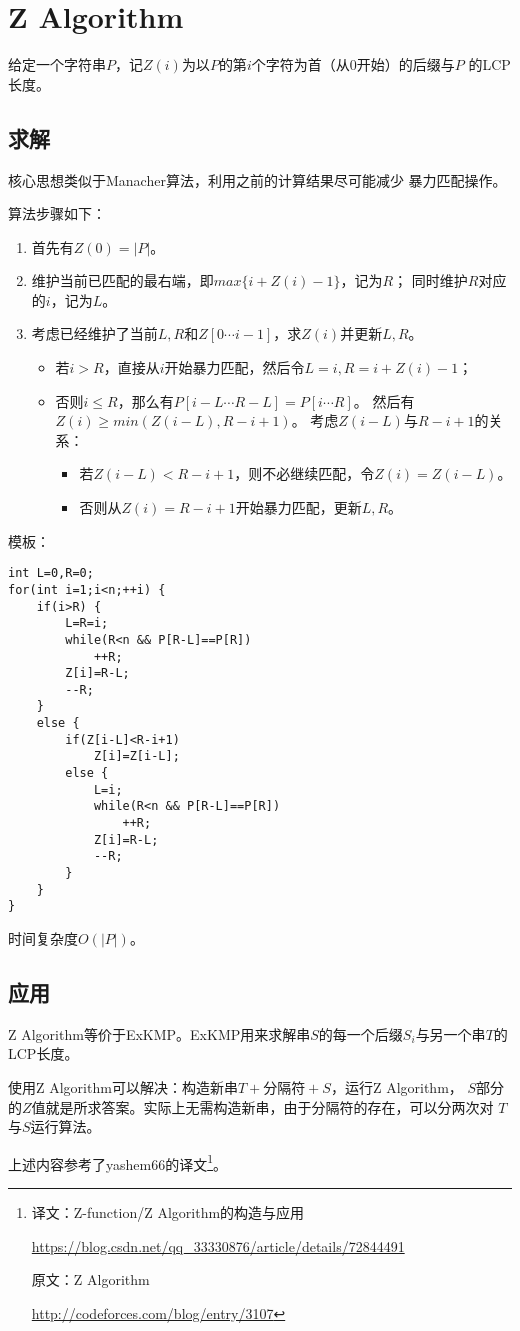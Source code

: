 \section{Z Algorithm}
\label{ZA}
给定一个字符串$P$，记$Z(i)$为以$P$的第$i$个字符为首（从0开始）的后缀与$P$
的LCP长度。
\subsection{求解}
核心思想类似于Manacher算法，利用之前的计算结果尽可能减少
暴力匹配操作。

算法步骤如下：
\begin{enumerate}
    \item 首先有$Z(0)=|P|$。
    \item 维护当前已匹配的最右端，即$max\{i+Z(i)-1\}$，记为$R$；
    同时维护$R$对应的$i$，记为$L$。
    \item 考虑已经维护了当前$L,R$和$Z[0\cdots i-1]$，求$Z(i)$并更新$L,R$。
    \begin{itemize}
        \item 若$i>R$，直接从$i$开始暴力匹配，然后令$L=i,R=i+Z(i)-1$；
        \item 否则$i\leq R$，那么有$P[i-L\cdots R-L]=P[i\cdots R]$。
        然后有$Z(i)\geq min(Z(i-L),R-i+1)$。
        考虑$Z(i-L)$与$R-i+1$的关系：
        \begin{itemize}
            \item 若$Z(i-L)<R-i+1$，则不必继续匹配，令$Z(i)=Z(i-L)$。
            \item 否则从$Z(i)=R-i+1$开始暴力匹配，更新$L,R$。
        \end{itemize}
    \end{itemize}
\end{enumerate}

模板：
\begin{lstlisting}
int L=0,R=0;
for(int i=1;i<n;++i) {
    if(i>R) {
        L=R=i;
        while(R<n && P[R-L]==P[R])
            ++R;
        Z[i]=R-L;
        --R;
    }
    else {
        if(Z[i-L]<R-i+1)
            Z[i]=Z[i-L];
        else {
            L=i;
            while(R<n && P[R-L]==P[R])
                ++R;
            Z[i]=R-L;
            --R;
        }
    }
}
\end{lstlisting}

时间复杂度$O(|P|)$。
\subsection{应用}
Z Algorithm等价于ExKMP。ExKMP用来求解串$S$的每一个后缀$S_i$与另一个串$T$的
LCP长度。

使用Z Algorithm可以解决：构造新串$T+\textrm{分隔符}+S$，运行Z Algorithm，
$S$部分的$Z$值就是所求答案。实际上无需构造新串，由于分隔符的存在，可以分两次对
$T$与$S$运行算法。

上述内容参考了yashem66的译文\footnote{
    译文：Z-function/Z Algorithm的构造与应用

    \url{https://blog.csdn.net/qq\_33330876/article/details/72844491}

    原文：Z Algorithm

    \url{http://codeforces.com/blog/entry/3107}
}。
